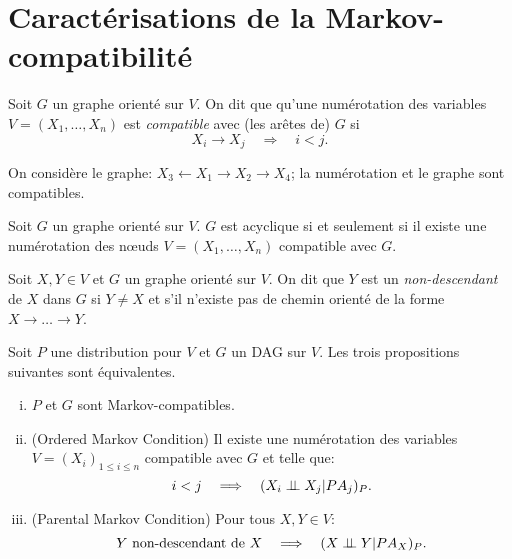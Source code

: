\section{Caractérisations de la Markov-compatibilité}
\label{sec:caract-de-la}

\begin{definition}
Soit $G$ un graphe orienté sur $V$. On dit que qu'une numérotation des
variables $V=(X_1,\dots,X_n)$ est \emph{compatible} avec (les
arêtes de) $G$ si \[ X_i\to X_j\quad \Longrightarrow \quad i<j. \]
\end{definition}
\begin{example}
  On considère le graphe:  $X_3\leftarrow X_1\to X_2\to X_4$; la numérotation et le graphe sont compatibles.
\end{example}
\begin{proposition}
Soit $G$ un graphe orienté sur $V$. $G$ est acyclique si et seulement
si il existe une numérotation des n\oe uds $V=(X_1,\dots,X_n)$
compatible avec $G$.
\end{proposition}
\begin{definition}
Soit $X,Y\in V$ et $G$ un graphe orienté sur $V$. On dit que $Y$ est un \emph{non-descendant} de
$X$ dans $G$ si $Y\neq X$ et s'il n'existe pas de chemin orienté de la forme $X\to \dots \to Y$.
\end{definition}
\begin{theorem}
\label{thm:caracterisations-markov-compatibilite}
Soit $P$ une distribution pour $V$ et $G$ un DAG sur $V$. Les trois propositions suivantes sont équivalentes.
\begin{enumerate}[(i)]
\item\label{item:P-G-compatibles} $P$ et $G$ sont Markov-compatibles.
\item\label{item:omc} (Ordered Markov Condition) Il existe une numérotation des variables $V=(X_i)_{1\leqslant i\leqslant n}$ compatible avec $G$ et telle que:
\begin{equation}
\label{eq:omc}
i<j\quad \Longrightarrow \quad (X_i\perp\!\!\!\perp X_j|PA_j)_P.
\end{equation}
\item\label{item:pmc} (Parental Markov Condition) Pour tous $X,Y\in V$:
\[ Y\text{ non-descendant de }X\quad \Longrightarrow \quad (X\perp\!\!\!\perp Y|PA_X)_P. \]
\end{enumerate}
\end{theorem}
